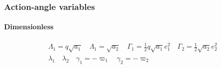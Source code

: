 \documentclass{article}
\begin{document}
\subsubsection{Action-angle variables}
\paragraph{Dimensionless}
\begin{align}
    &\Lambda_1=q\sqrt{a_1} \quad \Lambda_1=\sqrt{a_2} \quad \Gamma_1 = \frac12q\sqrt{a_1}e_1^2 \quad \Gamma_2=\frac12\sqrt{a_2}e_2^2\\
    &\lambda_1\quad \lambda_2\quad \gamma_1=-\varpi_1 \quad \gamma_2=-\varpi_2
\end{align}
\end{document}
